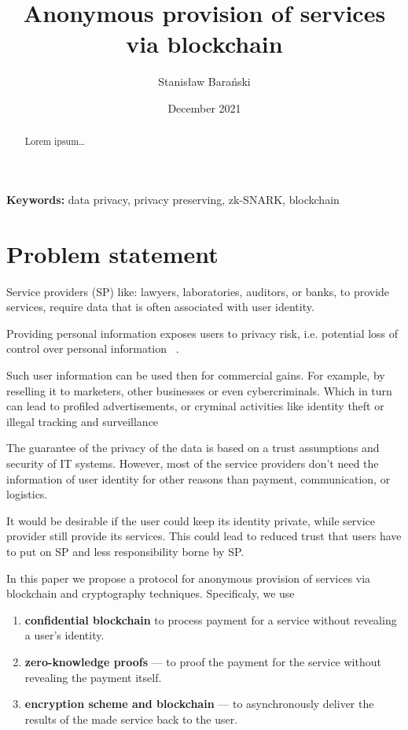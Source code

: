 \documentclass{article}
\title{Anonymous provision of services via blockchain}
\author{Stanisław Barański}
\date{December 2021}
\providecommand{\keywords}[1]{\textbf{Keywords:} #1}
\begin{document}
\maketitle

\begin{abstract}
Lorem ipsum\ldots
\end{abstract}
\keywords{data privacy, privacy preserving, zk-SNARK, blockchain}



\section{Problem statement}
Service providers (SP) like: lawyers, laboratories, auditors, or banks, to provide services, require data that is often associated with user identity.

Providing personal information exposes users to privacy risk, i.e. potential loss of control over personal information ~\cite{smith2011information}.

Such user information can be used then for commercial gains. For example, by reselling it to marketers, other businesses or even cybercriminals. Which in turn can lead to profiled advertisements, or cryminal activities like identity theft or illegal tracking and surveillance ~\cite{}

The guarantee of the privacy of the data is based on a trust assumptions and security of IT systems. However, most of the service providers don't need the information of user identity for other reasons than payment, communication, or logistics. 

It would be desirable if the user could keep its identity private, while service provider still provide its services. This could lead to reduced trust that users have to put on SP and less responsibility borne by SP.

In this paper we propose a protocol for anonymous provision of services via blockchain and cryptography techniques. Specificaly, we use
\begin{enumerate}
    \item \textbf{confidential blockchain} to process payment for a service without revealing a user's identity.
    \item \textbf{zero-knowledge proofs} — to proof the payment for the service without revealing the payment itself.
    \item \textbf{encryption scheme and blockchain} — to asynchronously deliver the results of the made service back to the user.
\end{enumerate}
\end{document}
